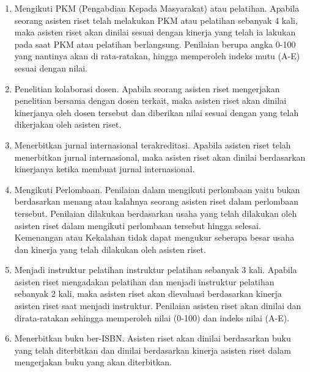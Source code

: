 \begin{enumerate}
 \item Mengikuti PKM (Pengabdian Kepada Masyarakat) atau pelatihan. Apabila seorang asisten riset telah melakukan PKM atau pelatihan sebanyak 4 kali, maka asisten riset akan dinilai sesuai dengan kinerja yang telah ia lakukan pada saat PKM atau pelatihan berlangsung. Penilaian berupa angka 0-100 yang nantinya akan di rata-ratakan, hingga memperoleh indeks mutu (A-E) sesuai dengan nilai.
 \item Penelitian kolaborasi dosen. Apabila seorang asisten riset mengerjakan penelitian bersama dengan dosen terkait, maka asisten riset akan dinilai kinerjanya oleh dosen tersebut dan diberikan nilai sesuai dengan yang telah dikerjakan oleh asisten riset.
 \item Menerbitkan jurnal internasional terakreditasi. Apabila asisten riset telah menerbitkan jurnal internasional, maka asisten riset akan dinilai berdasarkan kinerjanya ketika membuat jurnal internasional.
 \item Mengikuti Perlombaan. Penilaian dalam mengikuti perlombaan yaitu bukan berdasarkan menang atau kalahnya seorang asisten riset dalam perlombaan tersebut. Penilaian dilakukan berdasarkan usaha yang telah dilakukan oleh asisten riset dalam mengikuti perlombaan tersebut hingga selesai. Kemenangan atau Kekalahan tidak dapat mengukur seberapa besar usaha dan kinerja yang telah dilakukan oleh asisten riset.
 \item Menjadi instruktur pelatihan instruktur pelatihan sebanyak 3 kali. Apabila asisten riset mengadakan pelatihan dan menjadi instruktur pelatihan sebanyak 2 kali, maka asisten riset akan dievaluasi berdasarkan kinerja asisten riset saat menjadi instruktur. Penilaian asisten riset akan dinilai dan dirata-ratakan sehingga memperoleh nilai (0-100) dan indeks nilai (A-E).
 \item Menerbitkan buku ber-ISBN. Asisten riset akan dinilai berdasarkan buku yang telah diterbitkan dan dinilai berdasarkan kinerja asisten riset dalam mengerjakan buku yang akan diterbitkan.
\end{enumerate}



